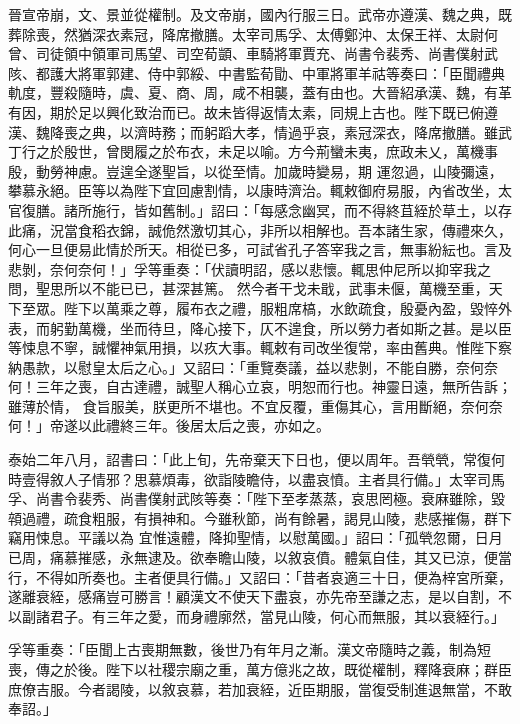\begin{pinyinscope}
 晉宣帝崩，文、景並從權制。及文帝崩，國內行服三日。武帝亦遵漢、魏之典，既葬除喪，然猶深衣素冠，降席撤膳。太宰司馬孚、太傅鄭沖、太保王祥、太尉何曾、司徒領中領軍司馬望、司空荀顗、車騎將軍賈充、尚書令裴秀、尚書僕射武
 陔、都護大將軍郭建、侍中郭綏、中書監荀勖、中軍將軍羊祜等奏曰：「臣聞禮典軌度，豐殺隨時，虞、夏、商、周，咸不相襲，蓋有由也。大晉紹承漢、魏，有革有因，期於足以興化致治而已。故未皆得返情太素，同規上古也。陛下既已俯遵漢、魏降喪之典，以濟時務；而躬蹈大孝，情過乎哀，素冠深衣，降席撤膳。雖武丁行之於殷世，曾閔履之於布衣，未足以喻。方今荊蠻未夷，庶政未乂，萬機事殷，動勞神慮。豈遑全遂聖旨，以從至情。加歲時變易，期
 運忽過，山陵彌遠，攀慕永絕。臣等以為陛下宜回慮割情，以康時濟治。輒敕御府易服，內省改坐，太官復膳。諸所施行，皆如舊制。」詔曰：「每感念幽冥，而不得終苴絰於草土，以存此痛，況當食稻衣錦，誠佹然激切其心，非所以相解也。吾本諸生家，傳禮來久，何心一旦便易此情於所天。相從已多，可試省孔子答宰我之言，無事紛紜也。言及悲剝，奈何奈何！」孚等重奏：「伏讀明詔，感以悲懷。輒思仲尼所以抑宰我之問，聖思所以不能已已，甚深甚篤。
 然今者干戈未戢，武事未偃，萬機至重，天下至眾。陛下以萬乘之尊，履布衣之禮，服粗席槁，水飲疏食，殷憂內盈，毀悴外表，而躬勤萬機，坐而待旦，降心接下，仄不遑食，所以勞力者如斯之甚。是以臣等悚息不寧，誠懼神氣用損，以疚大事。輒敕有司改坐復常，率由舊典。惟陛下察納愚款，以慰皇太后之心。」又詔曰：「重覽奏議，益以悲剝，不能自勝，奈何奈何！三年之喪，自古達禮，誠聖人稱心立哀，明恕而行也。神靈日遠，無所告訴；雖薄於情，
 食旨服美，朕更所不堪也。不宜反覆，重傷其心，言用斷絕，奈何奈何！」帝遂以此禮終三年。後居太后之喪，亦如之。



 泰始二年八月，詔書曰：「此上旬，先帝棄天下日也，便以周年。吾煢煢，常復何時壹得敘人子情邪？思慕煩毒，欲詣陵瞻侍，以盡哀憤。主者具行備。」太宰司馬孚、尚書令裴秀、尚書僕射武陔等奏：「陛下至孝蒸蒸，哀思罔極。衰麻雖除，毀顇過禮，疏食粗服，有損神和。今雖秋節，尚有餘暑，謁見山陵，悲感摧傷，群下竊用悚息。平議以為
 宜惟遠體，降抑聖情，以慰萬國。」詔曰：「孤煢忽爾，日月已周，痛慕摧感，永無逮及。欲奉瞻山陵，以敘哀僨。體氣自佳，其又已涼，便當行，不得如所奏也。主者便具行備。」又詔曰：「昔者哀適三十日，便為梓宮所棄，遂離衰絰，感痛豈可勝言！顧漢文不使天下盡哀，亦先帝至謙之志，是以自割，不以副諸君子。有三年之愛，而身禮廓然，當見山陵，何心而無服，其以衰絰行。」



 孚等重奏：「臣聞上古喪期無數，後世乃有年月之漸。漢文帝隨時之義，制為短
 喪，傳之於後。陛下以社稷宗廟之重，萬方億兆之故，既從權制，釋降衰麻；群臣庶僚吉服。今者謁陵，以敘哀慕，若加衰絰，近臣期服，當復受制進退無當，不敢奉詔。」




\end{pinyinscope}
